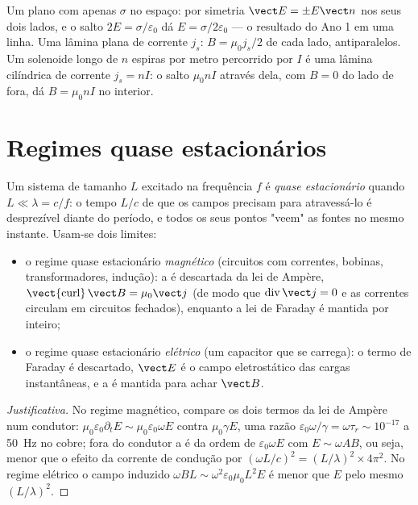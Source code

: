 \begin{example}\label{ex:b2:maxwell-equations:sheets}
Um plano com apenas $\sigma$ no espaço: por simetria $\vect E = \pm E\vect n$ nos
seus dois lados, e o salto $2E = \sigma/\varepsilon_0$ dá $E = \sigma/2\varepsilon_0$ ---
o resultado do Ano 1 em uma linha. Uma lâmina plana de corrente $j_s$: $B =
\mu_0j_s/2$ de cada lado, antiparalelos. Um solenoide longo de $n$ espiras por
metro percorrido por $I$ é uma lâmina cilíndrica de corrente $j_s = nI$: o salto
$\mu_0nI$ através dela, com $B = 0$ do lado de fora, dá $B = \mu_0nI$ no interior.
\end{example}

\section{Regimes quase estacionários}

\begin{definition}\label{def:b2:maxwell-equations:arqs}
Um sistema de tamanho $L$ excitado na frequência $f$ é \emph{quase estacionário}
quando $L \ll \lambda = c/f$: o tempo $L/c$ de que os campos precisam para atravessá-lo é
desprezível diante do período, e todos os seus pontos "veem" as
fontes no mesmo instante. Usam-se dois limites:
\begin{itemize}
  \item o regime quase estacionário \emph{magnético} (circuitos com
        correntes, bobinas, transformadores, indução): a  é descartada da lei de Ampère, $\operatorname{\vect{curl}}\vect B
        = \mu_0\vect j$ (de modo que $\operatorname{div}\vect j = 0$ e as correntes circulam em
        circuitos fechados), enquanto a lei de Faraday é mantida por inteiro;
  \item o regime quase estacionário \emph{elétrico} (um capacitor que
        se carrega): o termo de Faraday é descartado, $\vect E$ é o
        campo eletrostático das cargas instantâneas, e a
         é mantida para achar $\vect B$.
\end{itemize}
\end{definition}

\begin{proof}[Justificativa]
No regime magnético, compare os dois termos da lei de Ampère num
condutor: $\mu_0\varepsilon_0\partial_t E \sim \mu_0\varepsilon_0\omega E$ contra $\mu_0\gamma E$,
uma razão $\varepsilon_0\omega/\gamma = \omega\tau_r \sim 10^{-17}$ a \qty{50}{Hz} no cobre;
fora do condutor a  é da ordem de
$\varepsilon_0\omega E$ com $E \sim \omega AB$, ou seja, menor que o efeito da corrente
de condução por $(\omega L/c)^2 = (L/\lambda)^2 \times 4\pi^2$. No regime
elétrico o campo induzido $\omega BL \sim \omega^2\varepsilon_0\mu_0L^2E$ é menor que $E$
pelo mesmo $(L/\lambda)^2$.
\end{proof}

